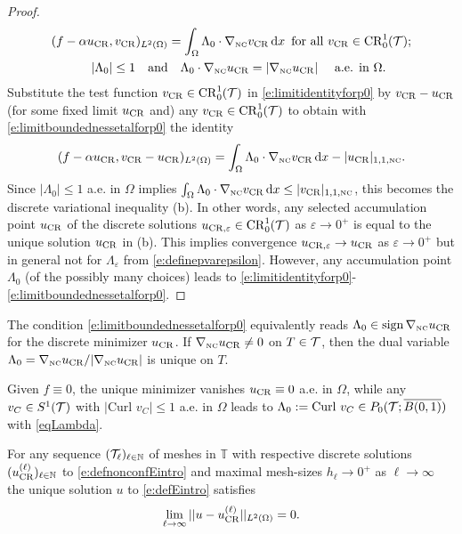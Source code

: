 \begin{proof}
\begin{align}
(f-\alpha u_{\operatorname{CR}}, v_{\operatorname{CR}})_{L^2(\Omega)} &=   \int_\Omega \Lambda_0 \cdot \nabla_{\textup{\tiny NC}} v_{\operatorname{CR}} \,\mathrm dx
\,\text{ for all }v_{\operatorname{CR}}\in {\operatorname{CR}}^1_0(\mathcal{T}) ; \\
\label{e:limitboundednessetalforp0}
|\Lambda_0|\le 1  \quad \text{and}&\quad
\Lambda_0\cdot \nabla_{\textup{\tiny NC}}u_{\operatorname{CR}}=| \nabla_{\textup{\tiny NC}}u_{\operatorname{CR}}| \quad\text{  a.e. in }\Omega.
\end{align}
Substitute the test function $v_{\operatorname{CR}}\in {\operatorname{CR}}^1_0(\mathcal{T})$ in  \eqref{e:limitidentityforp0} by  $v_{\operatorname{CR}}-u_{\operatorname{CR}}$ (for some fixed limit $u_{\operatorname{CR}}$
and) any  $v_{\operatorname{CR}}\in {\operatorname{CR}}^1_0(\mathcal{T})$ to obtain with \eqref{e:limitboundednessetalforp0}
the identity 
\[
(f-\alpha u_{\operatorname{CR}}, v_{\operatorname{CR}}-u_{\operatorname{CR}})_{L^2(\Omega)}=  \int_\Omega \Lambda_0 \cdot \nabla_{\textup{\tiny NC}} v_{\operatorname{CR}} \,\mathrm dx - | u_{\operatorname{CR}} |_{1,1,{\textup{\tiny NC}} }.
\]
Since    $|\Lambda_0|\le 1$  a.e. in $\Omega$ implies
$   \int_\Omega \Lambda_0 \cdot \nabla_{\textup{\tiny NC}} v_{\operatorname{CR}} \,\mathrm dx\le  | v_{\operatorname{CR}} |_{1,1,{\textup{\tiny NC}} }$, this becomes  the discrete variational inequality
(b). In other words, any selected accumulation point  $u_{\operatorname{CR}}$ of the discrete solutions $u_{\operatorname{CR},\varepsilon} \in {\operatorname{CR}}^1_0(\mathcal{T})$
as $\varepsilon \to 0^+$ is equal to the unique solution $u_{\operatorname{CR}}$  in (b). This implies convergence 
$u_{\operatorname{CR},\varepsilon} \to u_{\operatorname{CR}}$  as $\varepsilon \to 0^+$ but in general not for $\Lambda_\varepsilon$  from
\eqref{e:definepvarepsilon}. However,  any  accumulation point $\Lambda_0$ (of the possibly many choices) 
 leads to  \eqref{e:limitidentityforp0}-\eqref{e:limitboundednessetalforp0}.
\end{proof}

\begin{remark}
The condition \eqref{e:limitboundednessetalforp0} equivalently reads $\Lambda_0\in  \operatorname{sign} \nabla_{\textup{\tiny NC}} u_{\operatorname{CR}}$
for the discrete minimizer $u_{\operatorname{CR}}$. If $\nabla_{\textup{\tiny NC}}u_{\operatorname{CR}} \ne 0$ on $T\in\mathcal{T}$, then the dual 
variable $\Lambda_0=\nabla_{\textup{\tiny NC}}u_{\operatorname{CR}} /|\nabla_{\textup{\tiny NC}}u_{\operatorname{CR}} |$ is unique on $T$.  
\end{remark}

\begin{example}
Given $f\equiv 0$, the unique minimizer vanishes $u_{\operatorname{CR}}\equiv 0$ a.e. in $\Omega$,
while any 
$v_C\in S^1(\mathcal{T})$ with $|\text{Curl } v_C|\le 1$ a.e. in $\Omega$  leads to
$\Lambda_0:= \text{Curl } v_C\in P_0(\mathcal{T}; \overline{ B(0,1)})$ with \eqref{eqLambda}.
\end{example}


\begin{theorem}[convergence]
For any sequence $(\mathcal{T}_\ell)_{\ell\in\mathbb{N}}$ of meshes in $\mathbb{T}$ with 
respective discrete solutions $(u_{\operatorname{CR}}^{(\ell)})_{\ell\in\mathbb{N}}$ to
\eqref{e:defnonconfEintro} 
and 
maximal mesh-sizes  $h_\ell \to 0^+$ as $\ell\to \infty$
the unique solution $u$ to \eqref{e:defEintro} satisfies
\[
\lim_{\ell\to\infty} || u- u_{\operatorname{CR}}^{(\ell)}||_{L^2(\Omega)}=0. 
\]

\end{theorem}








